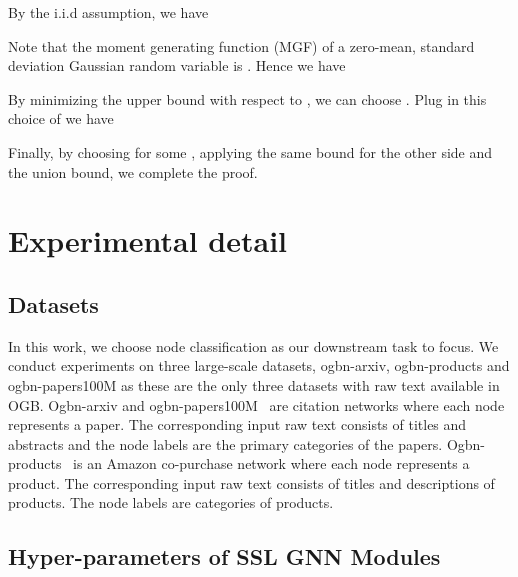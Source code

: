 \documentclass{article} \usepackage{iclr2022_conference,times}
\begin{document}
By the i.i.d assumption, we have

Note that the moment generating function (MGF) of a zero-mean,  standard deviation Gaussian random variable is . Hence we have

By minimizing the upper bound with respect to , we can choose . Plug in this choice of  we have

Finally, by choosing  for some , applying the same bound for the other side and the union bound, we complete the proof.


\section{Experimental detail}

\subsection{Datasets}
\label{apx:exp-data}



In this work, we choose node classification as our downstream task to focus. We conduct experiments on three large-scale datasets, ogbn-arxiv, ogbn-products and ogbn-papers100M as these are the only three datasets with raw text available in OGB. Ogbn-arxiv and ogbn-papers100M~\citep{wang2020microsoft,hu2020open} are citation networks where each node represents a paper. The corresponding input raw text consists of titles and abstracts and the node labels are the primary categories of the papers. Ogbn-products~\citep{chiang2019cluster,hu2020open} is an Amazon co-purchase network where each node represents a product. The corresponding input raw text consists of titles and descriptions of products. The node labels are categories of products. 

\subsection{Hyper-parameters of SSL GNN Modules}
\label{apx:hparams-ssl-baseline}
\end{document}
